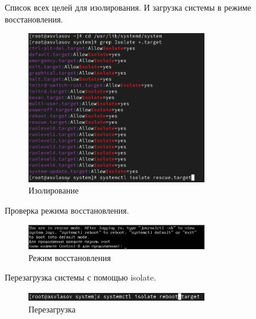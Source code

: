 \documentclass[
  12pt,
  a4paper,
  DIV=11,
  numbers=noendperiod]{scrreprt}
\begin{document}
Список всех целей для изолирования. И загрузка системы в режиме
восстановления.

\begin{figure}

{\centering \includegraphics[width=0.7\textwidth,height=\textheight]{image/12.png}

}

\caption{Изолирование}

\end{figure}%

Проверка режима восстановления.

\begin{figure}

{\centering \includegraphics[width=0.7\textwidth,height=\textheight]{image/11.png}

}

\caption{Режим восстановления}

\end{figure}%

Перезагрузка системы с помощью isolate.

\begin{figure}

{\centering \includegraphics[width=0.7\textwidth,height=\textheight]{image/13.png}

}

\caption{Перезагрузка}

\end{figure}%
\end{document}
